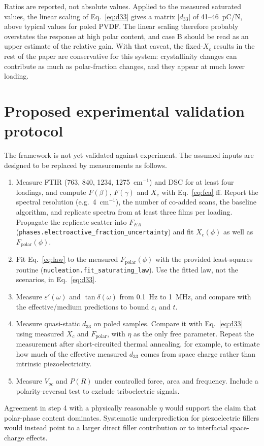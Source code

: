 \documentclass[11pt,a4paper]{article}
\newcommand{\dt}{d_{33}}
\newcommand{\Fp}{F_{\mathrm{polar}}}
\begin{document}
Ratios are reported, not absolute values. Applied to the measured saturated values, the linear scaling of Eq.~\eqref{eq:d33} gives a matrix $|\dt|$ of 41--46~pC/N, above typical values for poled PVDF. The linear scaling therefore probably overstates the response at high polar content, and case B should be read as an upper estimate of the relative gain. With that caveat, the fixed-$X_c$ results in the rest of the paper are conservative for this system: crystallinity changes can contribute as much as polar-fraction changes, and they appear at much lower loading.

\section{Proposed experimental validation protocol}\label{sec:valid}
The framework is not yet validated against experiment. The assumed inputs are designed to be replaced by measurements as follows.
\begin{enumerate}
\item Measure FTIR (763, 840, 1234, 1275~cm$^{-1}$) and DSC for at least four loadings, and compute $F(\beta)$, $F(\gamma)$ and $X_c$ with Eq.~\eqref{eq:fea} ff. Report the spectral resolution (e.g.\ 4~cm$^{-1}$), the number of co-added scans, the baseline algorithm, and replicate spectra from at least three films per loading. Propagate the replicate scatter into $F_{EA}$ (\texttt{phases.\allowbreak electroactive\_\allowbreak fraction\_\allowbreak uncertainty}) and fit $X_c(\phi)$ as well as $\Fp(\phi)$.
\item Fit Eq.~\eqref{eq:law} to the measured $\Fp(\phi)$ with the provided least-squares routine (\texttt{nucleation.\allowbreak fit\_\allowbreak saturating\_\allowbreak law}). Use the fitted law, not the scenarios, in Eq.~\eqref{eq:d33}.
\item Measure $\varepsilon'(\omega)$ and $\tan\delta(\omega)$ from 0.1~Hz to 1~MHz, and compare with the effective\-/medium predictions to bound $\varepsilon_i$ and $t$.
\item Measure quasi-static $\dt$ on poled samples. Compare it with Eq.~\eqref{eq:d33} using measured $X_c$ and $\Fp$, with $\eta$ as the only free parameter. Repeat the measurement after short-circuited thermal annealing, for example, to estimate how much of the effective measured $\dt$ comes from space charge rather than intrinsic piezoelectricity.
\item Measure $V_{oc}$ and $P(R)$ under controlled force, area and frequency. Include a polarity-reversal test to exclude triboelectric signals.
\end{enumerate}
Agreement in step 4 with a physically reasonable $\eta$ would support the claim that polar-phase content dominates. Systematic underprediction for piezoelectric fillers would instead point to a larger direct filler contribution or to interfacial space-charge effects.
\end{document}

